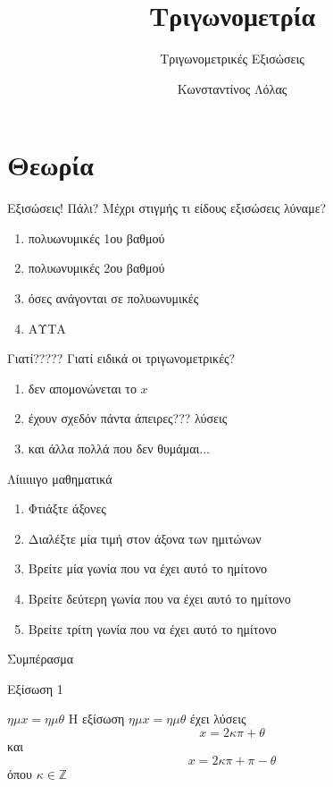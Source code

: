 \documentclass[greek]{beamer}
\title{Τριγωνομετρία}
\subtitle{Τριγωνομετρικές Εξισώσεις}
\author[Λόλας]{Κωνσταντίνος Λόλας}
\date{}
\begin{document}
\begin{frame}
 \titlepage
\end{frame}

\section{Θεωρία}
\begin{frame}{Εξισώσεις! Πάλι?}
 Μέχρι στιγμής τι είδους εξισώσεις λύναμε?
 \begin{enumerate}
  \item<1-> πολυωνυμικές 1ου βαθμού
  \item<2-> πολυωνυμικές 2ου βαθμού
  \item<3-> όσες ανάγονται σε πολυωνυμικές
  \item<4-> ΑΥΤΑ
 \end{enumerate}
\end{frame}

\begin{frame}{Γιατί?????}
 Γιατί ειδικά οι τριγωνομετρικές?
 \begin{enumerate}
  \item<1-> δεν απομονώνεται το $x$
  \item<2-> έχουν σχεδόν πάντα άπειρες??? λύσεις
  \item<3-> και άλλα πολλά που δεν θυμάμαι...
 \end{enumerate}
\end{frame}

\begin{frame}{Λίιιιιιγο μαθηματικά}
 \begin{enumerate}
  \item<1-> Φτιάξτε άξονες
  \item<2-> Διαλέξτε μία τιμή στον άξονα των ημιτώνων
  \item<3-> Βρείτε μία γωνία που να έχει αυτό το ημίτονο
  \item<4-> Βρείτε δεύτερη γωνία που να έχει αυτό το ημίτονο
  \item<5-> Βρείτε τρίτη γωνία που να έχει αυτό το ημίτονο
 \end{enumerate}
  Συμπέρασμα

\end{frame}

\begin{frame}{Εξίσωση 1}
 \begin{block}{$ημx=ημθ$}
  Η εξίσωση $ημx=ημθ$ έχει λύσεις
  $$x=2κπ+θ$$
  και
  $$x=2κπ+π-θ$$
  όπου $κ\in\mathbb{Z}$
 \end{block}
\end{frame}
\end{document}
